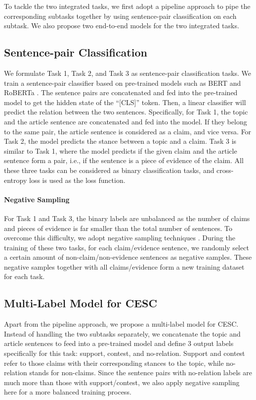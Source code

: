 \documentclass[11pt]{article}
\begin{document}
To tackle the two integrated tasks, we first adopt a pipeline approach to pipe the corresponding subtasks together by using sentence-pair classification on each subtask. We also propose two end-to-end models for the two integrated tasks.

\subsection{Sentence-pair Classification}
\label{sec:sentpairclassification}
We formulate Task 1, Task 2, and Task 3 as sentence-pair classification tasks.
We train a sentence-pair classifier based on pre-trained models such as BERT \cite{devlin2019bert} and RoBERTa \cite{liu2019roberta}.
The sentence pairs are concatenated and fed into the pre-trained model to get the hidden state of the ``[CLS]'' token.
Then, a linear classifier will predict the relation between the two sentences.
Specifically, for Task 1, the topic and the article sentence are concatenated and fed into the model.
If they belong to the same pair, the article sentence is considered as a claim, and vice versa.
For Task 2, the model predicts the stance between a topic and a claim.
Task 3 is similar to Task 1, where the model predicts if the given claim and the article sentence form a pair, i.e., if the sentence is a piece of evidence of the claim.
All these three tasks can be considered as binary classification tasks, and cross-entropy loss is used as the loss function.


\paragraph{Negative Sampling}
For Task 1 and Task 3, the binary labels are unbalanced as the number of claims and pieces of evidence is far smaller than the total number of sentences. 
To overcome this difficulty, we adopt negative sampling techniques \cite{mikolov2013distributed}. 
During the training of these two tasks, for each claim/evidence sentence, we randomly select a certain amount of non-claim/non-evidence sentences as negative samples. 
These negative samples together with all claims/evidence form a new training dataset for each task.

\subsection{Multi-Label Model for CESC}
Apart from the pipeline approach, we propose a multi-label model for CESC.
Instead of handling the two subtasks separately, we concatenate the topic and article sentences to feed into a pre-trained model and define 3 output labels specifically for this task: support, contest, and no-relation.
Support and contest refer to those claims with their corresponding stances to the topic, while no-relation stands for non-claims.
Since the sentence pairs with no-relation labels are much more than those with support/contest, we also apply negative sampling here for a more balanced training process.
\end{document}
